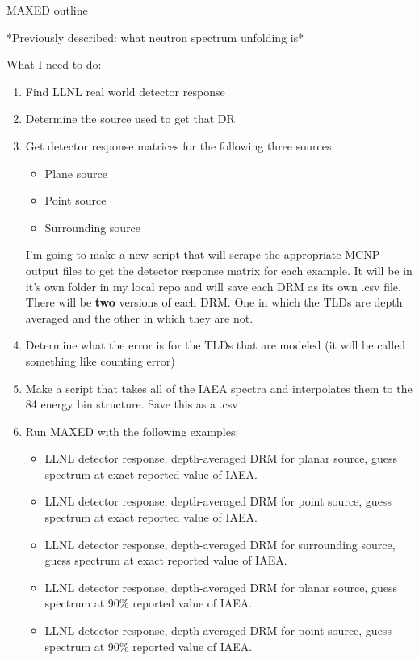\documentclass[11pt]{article}
\begin{document}
\begin{center}
MAXED outline
\end{center}
*Previously described: what neutron spectrum unfolding is*\\

\hfill


What I need to do:
\begin{enumerate}
\item Find LLNL real world detector response
\item Determine the source used to get that DR
\item Get detector response matrices for the following three sources:
\begin{itemize}
\item Plane source
\item Point source
\item Surrounding source
\end{itemize}
I'm going to make a new script that will scrape the appropriate MCNP output files to get the detector response matrix for each example. It will be in it's own folder in my local repo and will save each DRM as its own .csv file. There will be \textbf{two} versions of each DRM. One in which the TLDs are depth averaged and the other in which they are not.
\item Determine what the error is for the TLDs that are modeled (it will be called something like counting error)
\item Make a script that takes all of the IAEA spectra and interpolates them to the 84 energy bin structure. Save this as a .csv
\item Run MAXED with the following examples:
	\begin{itemize}
	\item LLNL detector response, depth-averaged DRM for planar source, guess spectrum at exact reported value of IAEA.
	\item LLNL detector response, depth-averaged DRM for point source, guess spectrum at exact reported value of IAEA.
	\item LLNL detector response, depth-averaged DRM for surrounding source, guess spectrum at exact reported value of IAEA.
	\item LLNL detector response, depth-averaged DRM for planar source, guess spectrum at 90\% reported value of IAEA.
	\item LLNL detector response, depth-averaged DRM for point source, guess spectrum at 90\% reported value of IAEA.

\end{itemize}
\end{enumerate}
\end{document}
